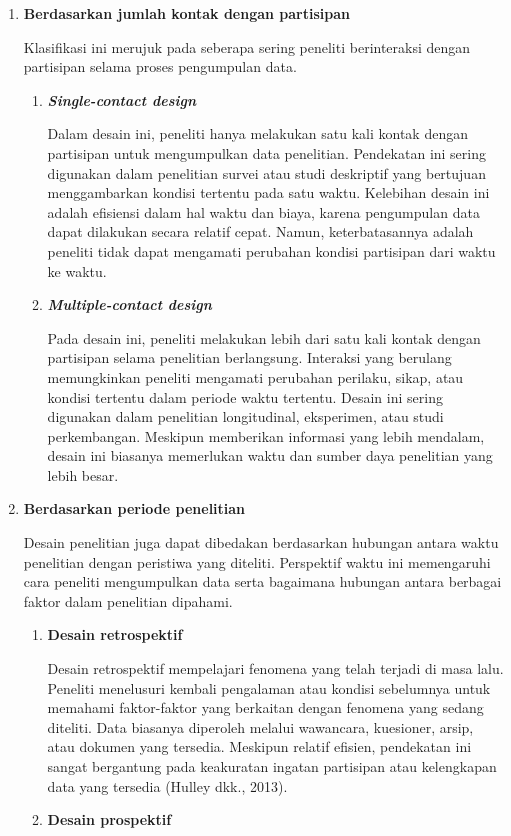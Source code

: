 \documentclass[
  indonesian,
  letterpaper,
  DIV=11,
  numbers=noendperiod]{scrreprt}
\begin{document}
\begin{enumerate}
\def\labelenumi{\arabic{enumi}.}
\item
  \textbf{Berdasarkan jumlah kontak dengan partisipan}

  Klasifikasi ini merujuk pada seberapa sering peneliti berinteraksi
  dengan partisipan selama proses pengumpulan data.

  \begin{enumerate}
  \def\labelenumii{\alph{enumii}.}
  \item
    \textbf{\emph{Single-contact design}}

    Dalam desain ini, peneliti hanya melakukan satu kali kontak dengan
    partisipan untuk mengumpulkan data penelitian. Pendekatan ini sering
    digunakan dalam penelitian survei atau studi deskriptif yang
    bertujuan menggambarkan kondisi tertentu pada satu waktu. Kelebihan
    desain ini adalah efisiensi dalam hal waktu dan biaya, karena
    pengumpulan data dapat dilakukan secara relatif cepat. Namun,
    keterbatasannya adalah peneliti tidak dapat mengamati perubahan
    kondisi partisipan dari waktu ke waktu.
  \item
    \textbf{\emph{Multiple-contact design}}

    Pada desain ini, peneliti melakukan lebih dari satu kali kontak
    dengan partisipan selama penelitian berlangsung. Interaksi yang
    berulang memungkinkan peneliti mengamati perubahan perilaku, sikap,
    atau kondisi tertentu dalam periode waktu tertentu. Desain ini
    sering digunakan dalam penelitian longitudinal, eksperimen, atau
    studi perkembangan. Meskipun memberikan informasi yang lebih
    mendalam, desain ini biasanya memerlukan waktu dan sumber daya
    penelitian yang lebih besar.
  \end{enumerate}
\item
  \textbf{Berdasarkan periode penelitian}

  Desain penelitian juga dapat dibedakan berdasarkan hubungan antara
  waktu penelitian dengan peristiwa yang diteliti. Perspektif waktu ini
  memengaruhi cara peneliti mengumpulkan data serta bagaimana hubungan
  antara berbagai faktor dalam penelitian dipahami.

  \begin{enumerate}
  \def\labelenumii{\alph{enumii}.}
  \item
    \textbf{Desain retrospektif}

    Desain retrospektif mempelajari fenomena yang telah terjadi di masa
    lalu. Peneliti menelusuri kembali pengalaman atau kondisi sebelumnya
    untuk memahami faktor-faktor yang berkaitan dengan fenomena yang
    sedang diteliti. Data biasanya diperoleh melalui wawancara,
    kuesioner, arsip, atau dokumen yang tersedia. Meskipun relatif
    efisien, pendekatan ini sangat bergantung pada keakuratan ingatan
    partisipan atau kelengkapan data yang tersedia (Hulley dkk., 2013).
  \item
    \textbf{Desain prospektif}


\end{enumerate}
\end{enumerate}
\end{document}
